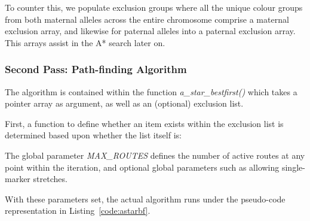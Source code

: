 \begin{enumerate}
{To counter this, we populate exclusion groups where all the unique colour groups from both maternal alleles across the entire chromosome comprise a maternal exclusion array, and likewise for paternal alleles into a paternal exclusion array. This arrays assist in the A* search later on.}

\end{enumerate}

\subsubsection{Second Pass: Path-finding Algorithm}

The algorithm is contained within the function \textit{a\_star\_bestfirst()} which takes a pointer array as argument, as well as an (optional) exclusion list.

First, a function to define whether an item exists within the exclusion list is determined based upon whether the list itself is:
\begin{enumerate}[label=(\alph*)]
\end{enumerate}

The global parameter \textit{MAX\_ROUTES}  defines the number of active routes at any point within the iteration, and optional global parameters such as allowing single-marker stretches.

With these parameters set, the actual algorithm runs under the pseudo-code representation in Listing~\ref{code:astarbf}. 


